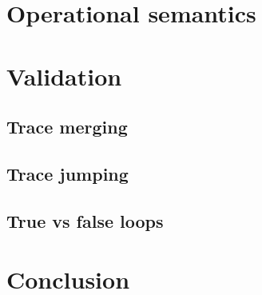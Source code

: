 \documentclass{report}
\begin{document}
\chapter{Operational semantics}

\chapter{Validation}
\section{Trace merging}
\section{Trace jumping}
\section{True vs false loops}

\chapter{Conclusion}
\end{document}
